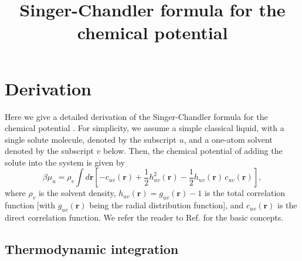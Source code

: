 \documentclass[12pt]{article}
\begin{document}
\newcommand{\vct}[1]{\mathbf{#1}}
\newcommand{\vr}{\vct{r}}
\newcommand{\vrN}{\mathbf{r}^N}
\newcommand{\vrn}{\mathbf{r}^n}
\newcommand{\vk}{\vct{k}}
\newcommand{\dvk}{\frac{ d \vk  }{(2\pi)^3}}
\newcommand{\FT}[1]{\tilde{#1}}
\newcommand{\FTc}{\FT{c}}
\newcommand{\FTh}{\FT{h}}

\newcommand{\plam}{\partial_\lambda}
\newcommand{\pbet}{\partial_\beta}



\title{Singer-Chandler formula for the chemical potential}
\date{}
\maketitle



\section{Derivation}

Here we give a detailed derivation of the Singer-Chandler formula
  for the chemical potential \cite{singer}.
For simplicity, we assume a simple classical liquid,
  with a single solute molecule, denoted by the subscript $u$,
  and a one-atom solvent denoted by the subscript $v$ below.
Then, the chemical potential of adding the solute into
  the system is given by
%
\begin{equation}
\beta \mu_u
  =
  \rho_v \int d\vr
  \left[
    - c_{uv}(\vr)
    + \frac{1}{2} h_{uv}^2(\vr)
    - \frac{1}{2} h_{uv}(\vr) \, c_{uv}(\vr)
  \right],
  \label{eq:singer}
\end{equation}
%
where $\rho_v$ is the solvent density,
  $h_{uv}(\vr) = g_{uv}(\vr) - 1$ is the total correlation function
  [with $g_{uv}(\vr)$ being the radial distribution function],
and $c_{uv}(\vr)$ is the direct correlation function.
We refer the reader to Ref. \cite{hansen}
  for the basic concepts.
%



\subsection{Thermodynamic integration}
\end{document}
